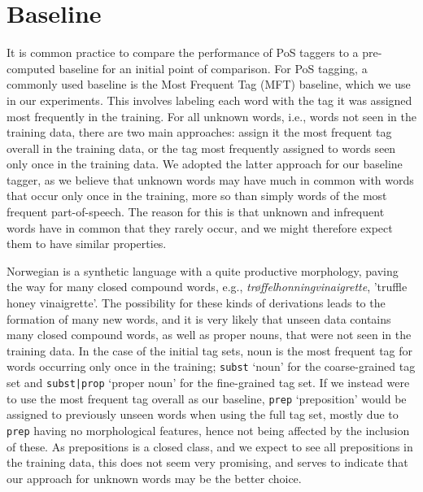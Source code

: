 \documentclass[a4paper,12pt,english]{book}
\begin{document}
\section{Baseline}
It is common practice to compare the performance of PoS taggers to a
pre-computed baseline for an initial point of comparison.
For PoS tagging, a commonly used baseline is the Most Frequent Tag (MFT)
baseline, which we use in our experiments. This involves labeling each word
with the tag it was assigned most frequently in the training. For all unknown
words, i.e., words not seen in the training data, there are two main
approaches: assign it the most frequent tag overall in the training data, or
the tag most frequently assigned to words seen only once in the training data.
We adopted the latter approach for our baseline tagger, as we believe that
unknown words may have much in common with words that occur only once in the
training, more so than simply words of the most frequent part-of-speech. The
reason for this is that unknown and infrequent words have in common that they
rarely occur, and we might therefore expect them to have similar properties.

Norwegian is a synthetic language with a quite productive morphology, paving
the way for many closed compound words, e.g., \emph{trøffelhonningvinaigrette},
'truffle honey vinaigrette'. The possibility for these kinds of derivations
leads to the formation of many new words, and it is very likely that unseen
data contains many closed compound words, as well as proper nouns, that were
not seen in the training data. In the case of the initial tag sets, noun is the
most frequent tag for words occurring only once in the training; \texttt{subst}
`noun' for the coarse-grained tag set and \texttt{subst|prop} `proper noun' for
the fine-grained tag set. If we instead were to use the most frequent tag
overall as our baseline, \texttt{prep} `preposition' would be assigned to
previously unseen words when using the full tag set, mostly due to
\texttt{prep} having no morphological features, hence not being affected by the
inclusion of these.  As prepositions is a closed class, and we expect to see
all prepositions in the training data, this does not seem very promising, and
serves to indicate that our approach for unknown words may be the better
choice.
\end{document}
